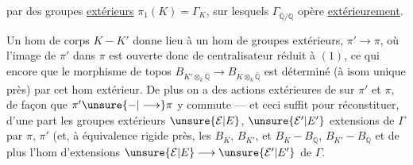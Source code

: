 par des groupes  \uline{extérieurs} $\pi_1(K)=\Gamma_K$, sur lesquels  $\Gamma_{\overline{\mathbb Q}/\mathbb Q}$ opère \uline{extérieurement}.

Un hom de corps $K-K'$ donne lieu à un hom de groupes extérieurs,
 $\pi'\longrightarrow\pi$, où l'image de $\pi'$ dans $\pi$ est ouverte donc de centralisateur réduit à $(1)$, ce qui  encore que le morphisme de topos $B_{K'\otimes_k\overline{\mathbb Q}}\longrightarrow B_{K\otimes_k\overline{\mathbb Q}}$ est déterminé (à isom unique près) par cet hom extérieur. De plus on a des actions extérieures de  sur $\pi'$ et $\pi$, de façon que $\pi'\unsure{-|\longrightarrow}\pi$ y commute --- et ceci suffit pour réconstituer, d'une part les groupes extérieurs $\unsure{\mathcal E|E}$, $\unsure{\mathcal E'|E'}$ extensions  de $\Gamma$ par $\pi$, $\pi'$ (et, à équivalence rigide près, les $B_K$, $B_{K'}$, et $B_K-B_{\mathbb Q}$, $B_{K'}-B_{\mathbb Q}$ et de plus l'hom d'extensions  $\unsure{\mathcal E|E}\longrightarrow\unsure{\mathcal E'|E'}$ de $\Gamma$.
